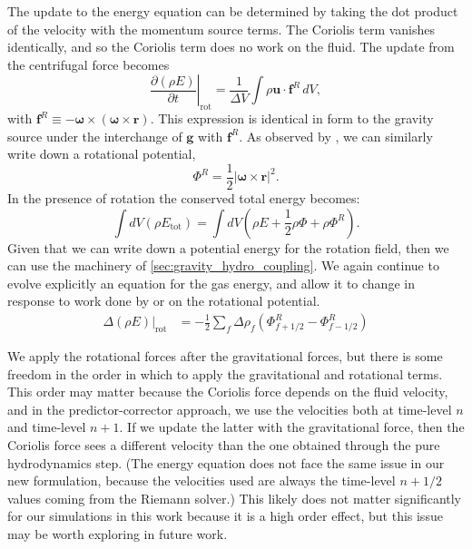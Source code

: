 \documentclass[12pt]{article}
\begin{document}
The update to the energy equation can be determined by taking the dot product of the velocity
with the momentum source terms. The Coriolis term vanishes identically, and so
the Coriolis term does no work on the fluid. The update from the centrifugal force becomes
\begin{equation}
  \left.\frac{\partial(\rho E)}{\partial t}\right|_{\text{rot}} = \frac{1}{\Delta V}\int \rho \mathbf{u} \cdot \mathbf{f}^R\, dV,
\end{equation}
with $\mathbf{f}^R \equiv  -{\bm\omega} \times \left({\bm\omega} \times \mathbf{r}\right)$. 
This expression is identical in form to the gravity source under the interchange of $\mathbf{g}$ with $\mathbf{f}^R$.
As observed by \cite{marcello:2012}, we can similarly write down a rotational potential,
\begin{equation}
  \Phi^R = \frac{1}{2} \left| {\bm\omega} \times \mathbf{r} \right|^2.
\end{equation}
In the presence of rotation the conserved total energy becomes:
\begin{equation}
  \int dV (\rho E_{\text{tot}}) = \int dV \left( \rho E + \frac{1}{2} \rho \Phi + \rho \Phi^R \right).
\end{equation}
Given that we can write down a potential energy for the rotation field, then we can use the machinery of 
\autoref{sec:gravity_hydro_coupling}. We again continue to evolve explicitly an equation for 
the gas energy, and allow it to change in response to work done by or on the rotational potential.
\begin{align}
  \left.\Delta(\rho E)\right|_{\text{rot}} &= -\frac{1}{2}\sum_{f} \Delta \rho_{f} (\Phi^R_{f+1/2} - \Phi^R_{f-1/2})
\end{align}

We apply the rotational forces after the gravitational forces, but 
there is some freedom in the order in which to apply the gravitational and rotational terms.
This order may matter because the Coriolis force depends on the fluid velocity, and 
in the predictor-corrector approach, we use the velocities both at 
time-level $n$ and time-level $n+1$. If we update the latter with the gravitational force, 
then the Coriolis force sees a different velocity than the one obtained through the 
pure hydrodynamics step. (The energy equation does not face the same issue in our new formulation,
because the velocities used are always the time-level $n+1/2$ values coming from the Riemann solver.)
This likely does not matter significantly for our simulations in this work because it is
a high order effect, but this issue may be worth exploring in future work.
\end{document}
